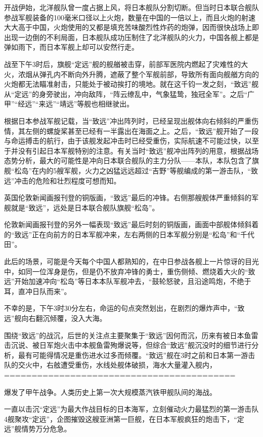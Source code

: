 \documentclass[12pt,UTF8]{ctexbook}
\begin{document}
开战伊始，北洋舰队曾一度占据上风，将日本舰队分割切断。但当时日本联合舰队参战军舰装备的100毫米口径以上火炮，数量在中国的一倍以上，而且火炮的射速大大高于中国，火炮使用的又都是填充苦味酸烈性炸药的炮弹，因而很快战场上即出现一边倒的不利局面，日本舰队成功压制住了北洋舰队的火力，中国各舰上都是弹如雨下，而日本军舰上却可以安然行走。

战至下午3时后，旗舰“定远”舰的舰艏被击穿，前部军医院内燃起了灾难性的大火，浓烟从弹孔内不断向外升腾，遮蔽了整个军舰前部，导致所有面向舰艏方向的火炮都无法瞄准射击，只能处于被动挨打的境地。就在这千钧一发之刻，“致远”舰从“定远”的身旁驶出，冲向敌阵，“阵云缭乱中，气象猛鸷，独冠全军”。之后“广甲”“经远”“来远”“靖远”等舰也相继驶出。

根据日本参战军舰记载，当“致远”冲出阵列时，已经呈现出舰体向右倾斜的严重伤情，其左侧的螺旋桨甚至已经有一半露出在海面之上。之后，“致远”舰开始了一段与命运搏击的航行，由于该舰发起冲击时已经受重伤，实际航速不可能过快，以至于并没有引起日本军舰特别的注意。有关当时“致远”舰冲出阵列的用意，根据战场态势分析，最大的可能性是冲向日本联合舰队的主力分队——本队，本队包含了旗舰“松岛”在内的5艘军舰，火力之凶猛远远超过“吉野”等舰编成的第一游击队，“致远”冲击的危险和壮烈程度可想而知。

英国伦敦新闻画报刊登的铜版画，“致远”最后的冲锋。右侧那艘舰体严重倾斜的军舰就是“致远”，远处是日本联合舰队旗舰“松岛”。

伦敦新闻画报刊登的另外一幅表现“致远”最后时刻的铜版画，画面中部舰体倾斜着的“致远”正在向前方的日本军舰冲来，左右两侧的日本军舰分别是“松岛”和“千代田”。

此后的场景，可能是今天每个中国人都熟知的，在中日参战各舰上一片惊讶的目光中，如同一位浑身是伤，但是仍不放弃冲锋的勇士，重伤侧倾、燃烧着大火的“致远”开始加速冲向“松岛”等日本本队军舰冲去，“鼓轮怒驶，且沿途鸣炮，不绝于耳，直冲日队而来”。

不幸的是，下午3时30分左右，命运的句点突然划出，在剧烈的爆炸声中，“致远”舰向右翻沉倾覆，没入大海。

围绕“致远”的战沉，后世的关注点主要聚集于“致远”因何而沉，历来有被日本鱼雷击沉说、被日军炮火击中本舰鱼雷殉爆说等，但综合“致远”舰沉没时的细节进行分析，最有可能得情况是重伤进水过多而倾覆。“致远”舰在3时之前和日本第一游击队的交火中，右舷遭受重伤，水线处舰体破损，海水大量灌入舰内，
==========================================

爆发了甲午战争。人类历史上第一次大规模蒸汽铁甲舰队间的海战。

一直以击沉“定远”为最大作战目标的日本海军，立刻催动火力最猛烈的第一游击队4舰聚攻“定远”，企图摧毁这艘亚洲第一巨舰，在日本军舰疯狂的炮击下，“定远”舰情势万分危急。
\end{document}
